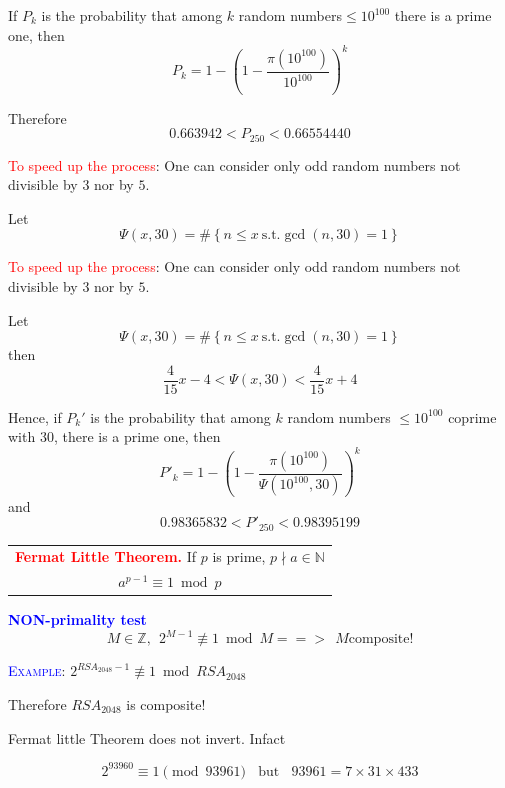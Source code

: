 \documentclass[landscape,handout]{powersem} %
\newcommand{\heading}[1]{%
 \begin{center}
  \large\bf
  \shadowbox{{\textcolor{conceptcolor}{#1}}}%
 \end{center}
 \vspace{1ex minus 1ex}}
\begin{document}
\begin{slide}
If $P_{k}$ is the probability that among $k$ random numbers$\leq
10^{100}$ there is a prime one, then\pause
$$P_k=1-\left(1-\frac{\pi(10^{100})}{10^{100}}\right)^k$$\pause

Therefore
$$0.663942
<P_{250}<
 0.66554440
$$
\bigskip\pause

\textcolor{red}{To speed up the process}: One can
consider only odd random numbers not divisible by
$3$ nor by $5$.\pause

Let
$$\Psi(x,30)=\#\left\{n\leq x\ \textrm{s.t.} \gcd(n,30)=1\right\}$$

\end{slide}

\begin{slide}
\textcolor{red}{To speed up the process}: One can
consider only odd random numbers not divisible by
$3$ nor by $5$.\pause

Let
$$\Psi(x,30)=\#\left\{n\leq x\ \textrm{s.t.} \gcd(n,30)=1\right\}$$
then\pause
$$\frac{4}{15}x-4<\Psi(x,30)<\frac{4}{15}x+4$$\pause

Hence, if $P_k'$ is the probability that among $k$ random numbers $\leq 10^{100}$
coprime with 30, there is a prime one, then\pause
$$P'_k=1-\left(1-\frac{\pi(10^{100})}{\Psi(10^{100},30)}\right)^k$$\pause
and
$$0.98365832
<P'_{250}<
 0.98395199$$
\end{slide}


\begin{slide}
\heading{\textsl{B.} Primality test}\pause


\begin{center}
\begin{tabular}{|c|}
\hline \textbf{\textcolor{red}{Fermat Little Theorem.}} If $p$ is prime, $p\nmid a\in{\mathbb N}$\\
$a^{p-1}\equiv1\bmod p$
\\\hline\end{tabular}
\end{center}\pause
\bigskip

\textbf{\textcolor{blue}{NON-primality test}}
$$M\in{\mathbb Z},\ \ 2^{M-1}\not\equiv 1\bmod M =\!\!\!=\!\!\!>\ \  M \textrm{composite!}$$\pause

\textsc{\textcolor{blue}{Example}:} $2^{RSA_{2048}-1}\not\equiv1\bmod RSA_{2048}$\\
\centerline{Therefore $RSA_{2048}$ is composite!}\pause

Fermat little Theorem does not invert. Infact\pause

$$2^{93960}\equiv 1\pmod{93961}\ \ \ \ \textrm{but}\ \ \ \ 93961
=7\times31\times433$$
 \end{slide}
\end{document}
